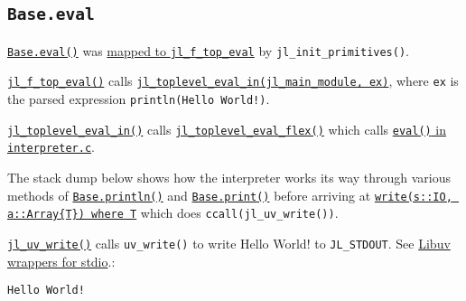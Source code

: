 \hypertarget{5161519074100035363}{}


\subsection{\texttt{Base.eval}}



\hyperlink{7507639810592563424}{\texttt{Base.eval()}} was \href{https://github.com/JuliaLang/julia/blob/master/src/builtins.c}{mapped to \texttt{jl\_f\_top\_eval}} by \texttt{jl\_init\_primitives()}.



\href{https://github.com/JuliaLang/julia/blob/master/src/builtins.c}{\texttt{jl\_f\_top\_eval()}} calls \href{https://github.com/JuliaLang/julia/blob/master/src/builtins.c}{\texttt{jl\_toplevel\_eval\_in(jl\_main\_module, ex)}}, where \texttt{ex} is the parsed expression \texttt{println({\textquotedbl}Hello World!{\textquotedbl})}.



\href{https://github.com/JuliaLang/julia/blob/master/src/builtins.c}{\texttt{jl\_toplevel\_eval\_in()}} calls \href{https://github.com/JuliaLang/julia/blob/master/src/toplevel.c}{\texttt{jl\_toplevel\_eval\_flex()}} which calls \href{https://github.com/JuliaLang/julia/blob/master/src/interpreter.c}{\texttt{eval()} in \texttt{interpreter.c}}.



The stack dump below shows how the interpreter works its way through various methods of \hyperlink{783803254548423222}{\texttt{Base.println()}} and \hyperlink{8248717042415202230}{\texttt{Base.print()}} before arriving at \href{https://github.com/JuliaLang/julia/blob/master/base/stream.jl}{\texttt{write(s::IO, a::Array\{T\}) where T}}  which does \texttt{ccall(jl\_uv\_write())}.



\href{https://github.com/JuliaLang/julia/blob/master/src/jl\_uv.c}{\texttt{jl\_uv\_write()}} calls \texttt{uv\_write()} to write {\textquotedbl}Hello World!{\textquotedbl} to \texttt{JL\_STDOUT}. See \hyperlink{11668969309999094552}{Libuv wrappers for stdio}.:




\begin{lstlisting}
Hello World!
\end{lstlisting}




